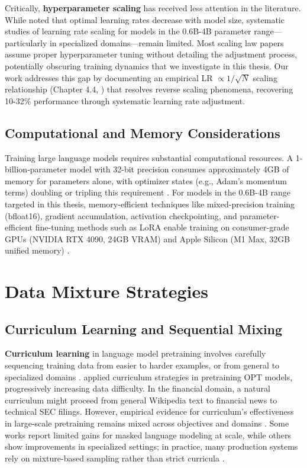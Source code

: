 Critically, \textbf{hyperparameter scaling} has received less attention in the literature. While \textcite{mccandlish2018empirical} noted that optimal learning rates decrease with model size, systematic studies of learning rate scaling for models in the 0.6B-4B parameter range---particularly in specialized domains---remain limited. Most scaling law papers assume proper hyperparameter tuning without detailing the adjustment process, potentially obscuring training dynamics that we investigate in this thesis. Our work addresses this gap by documenting an empirical LR $\propto 1/\sqrt{N}$ scaling relationship (Chapter 4.4, ) that resolves reverse scaling phenomena, recovering 10-32\% performance through systematic learning rate adjustment.

\subsection{Computational and Memory Considerations}

Training large language models requires substantial computational resources. A 1-billion-parameter model with 32-bit precision consumes approximately 4GB of memory for parameters alone, with optimizer states (e.g., Adam's momentum terms) doubling or tripling this requirement \parencite{rajbhandari2020zero,kingma2014adam}. For models in the 0.6B-4B range targeted in this thesis, memory-efficient techniques like mixed-precision training (bfloat16), gradient accumulation, activation checkpointing, and parameter-efficient fine-tuning methods such as LoRA enable training on consumer-grade GPUs (NVIDIA RTX 4090, 24GB VRAM) and Apple Silicon (M1 Max, 32GB unified memory) \parencite{narayanan2021efficient,hu2021lora}.

\section{Data Mixture Strategies}

\subsection{Curriculum Learning and Sequential Mixing}

\textbf{Curriculum learning} in language model pretraining involves carefully sequencing training data from easier to harder examples, or from general to specialized domains \parencite{bengio2009curriculum}. \textcite{wu2022opt} applied curriculum strategies in pretraining OPT models, progressively increasing data difficulty. In the financial domain, a natural curriculum might proceed from general Wikipedia text to financial news to technical SEC filings. However, empirical evidence for curriculum's effectiveness in large-scale pretraining remains mixed across objectives and domains \parencite{longpre2023pretrainer}. Some works report limited gains for masked language modeling at scale, while others show improvements in specialized settings; in practice, many production systems rely on mixture-based sampling rather than strict curricula \parencite{raffel2020exploring,wu2022opt}.

